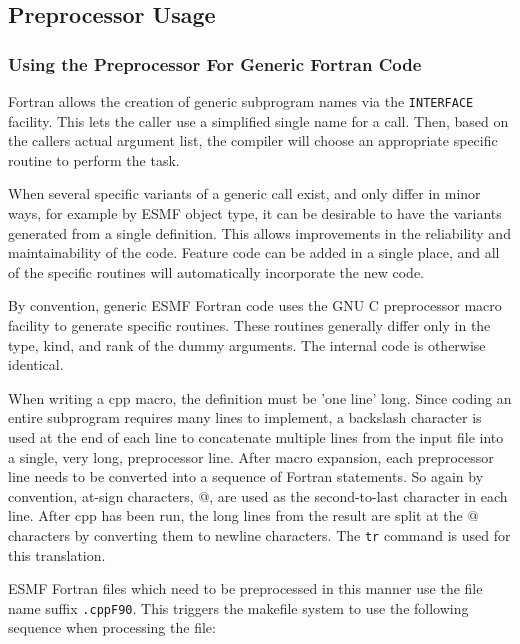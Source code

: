 
\subsection{Preprocessor Usage}

\subsubsection{Using the Preprocessor For Generic Fortran Code}

Fortran allows the creation of generic subprogram names via the
{\tt INTERFACE} facility.  This lets the caller use a simplified
single name for a call.  Then, based on the callers actual argument list,
the compiler will choose an appropriate specific routine to perform
the task.

When several specific variants of a generic call exist, and only
differ in minor ways, for example by ESMF object type, it can be
desirable to have the variants generated from a single definition.
This allows improvements in the reliability and maintainability of
the code.  Feature code can be added in a single place, and all
of the specific routines will automatically incorporate the new code.

By convention, generic ESMF Fortran code uses the GNU C preprocessor
macro facility to generate specific routines.  These routines generally
differ only in the type, kind, and rank of the dummy arguments.  The
internal code is otherwise identical.

When writing a cpp macro, the definition must be 'one line' long.
Since coding an entire subprogram requires many lines to implement,
a backslash character is used at the end of each line to concatenate
multiple lines from the input file into a single, very long, preprocessor
line.  After macro expansion, each preprocessor line needs to be
converted into a sequence of Fortran statements.  So again by
convention, at-sign characters, @, are used as the second-to-last
character in each line.  After cpp has been run, the long lines from
the result are split at the @ characters by converting them to newline
characters.  The {\tt tr} command is used for this translation.

ESMF Fortran files which need to be preprocessed in this manner use
the file name suffix {\tt .cppF90}.  This triggers the makefile system
to use the following sequence when processing the file:

